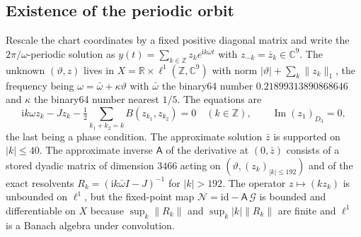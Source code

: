 \documentclass[11pt,a4paper]{article}
\theoremstyle{plain}
\theoremstyle{definition}
\theoremstyle{remark}
\newcommand{\R}{\mathbb R}
\newcommand{\C}{\mathbb C}
\newcommand{\Z}{\mathbb Z}
\newcommand{\ii}{\mathrm i}
\newcommand{\norm}[1]{\lVert#1\rVert}
\newcommand{\abs}[1]{\lvert#1\rvert}
\DeclareMathOperator{\Imm}{Im}
\begin{document}
\begin{table}[t]
\centering\footnotesize\setlength{\tabcolsep}{4.5pt}

\caption{The eighteen rate constants of the finite witness, rounded to five significant digits (the exact values are the rationals determined by Table~\ref{tab:dyadic} and \eqref{eq:rates}). ``Physical'' values refer to the illustrative, uncalibrated scales $0.1\,\mu\mathrm M$ and $100\,\mathrm s$ of Section~\ref{sec:physical}.}
\label{tab:rates}
\end{table}

\subsection{Existence of the periodic orbit}
Rescale the chart coordinates by a fixed positive diagonal matrix and write the $2\pi/\omega$-periodic solution as $y(t)=\sum_{k\in\Z}z_ke^{\ii k\omega t}$ with $z_{-k}=\bar z_k\in\C^9$. The unknown $(\vartheta,z)$ lives in $X=\R\times\ell^1(\Z,\C^9)$ with norm $\abs\vartheta+\sum_k\norm{z_k}_1$, the frequency being $\omega=\bar\omega+\kappa\vartheta$ with $\bar\omega$ the binary64 number $0.21899313890868646$ and $\kappa$ the binary64 number nearest $1/5$. The equations are
\begin{equation}\label{eq:fourier}
\ii k\omega z_k-Jz_k-\tfrac12\sum_{k_1+k_2=k}B(z_{k_1},z_{k_2})=0\quad(k\in\Z),\qquad \Imm (z_1)_{D_3}=0,
\end{equation}
the last being a phase condition. The approximate solution $\bar z$ is supported on $\abs k\le40$. The approximate inverse $\mathsf A$ of the derivative at $(0,\bar z)$ consists of a stored dyadic matrix of dimension $3466$ acting on $(\vartheta,(z_k)_{\abs k\le192})$ and of the exact resolvents $R_k=(\ii k\bar\omega I-J)^{-1}$ for $\abs k>192$. The operator $z\mapsto(kz_k)$ is unbounded on $\ell^1$, but the fixed-point map $\mathcal N=\mathrm{id}-\mathsf A\,\mathcal G$ is bounded and differentiable on $X$ because $\sup_k\norm{R_k}$ and $\sup_k\abs k\norm{R_k}$ are finite and $\ell^1$ is a Banach algebra under convolution.
\end{document}
